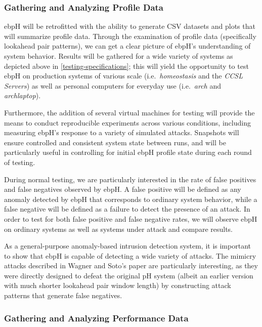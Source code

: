 \documentclass[
  12pt]{findlay}
\begin{document}
\hypertarget{gathering-and-analyzing-profile-data}{%
\subsubsection{Gathering and Analyzing Profile
Data}\label{gathering-and-analyzing-profile-data}}

ebpH will be retrofitted with the ability to generate CSV datasets and
plots that will summarize profile data. Through the examination of
profile data (specifically lookahead pair patterns), we can get a clear
picture of ebpH's understanding of system behavior. Results will be
gathered for a wide variety of systems as depicted above in
\autoref{testing-specifications}; this will yield the opportunity to
test ebpH on production systems of various scale
(i.e.~\emph{homeostasis} and the \emph{CCSL Servers}) as well as
personal computers for everyday use (i.e.~\emph{arch} and
\emph{archlaptop}).

Furthermore, the addition of several virtual machines for testing will
provide the means to conduct reproducible experiments across various
conditions, including measuring ebpH's response to a variety of
simulated attacks. Snapshots will ensure controlled and consistent
system state between runs, and will be particularly useful in
controlling for initial ebpH profile state during each round of testing.

During normal testing, we are particularly interested in the rate of
false positives and false negatives observed by ebpH. A false positive
will be defined as any anomaly detected by ebpH that corresponds to
ordinary system behavior, while a false negative will be defined as a
failure to detect the presence of an attack. In order to test for both
false positive and false negative rates, we will observe ebpH on
ordinary systems as well as systems under attack and compare results.

As a general-purpose anomaly-based intrusion detection system, it is
important to show that ebpH is capable of detecting a wide variety of
attacks. The mimicry attacks described in Wagner and Soto's paper
\autocite{wagner02} are particularly interesting, as they were directly
designed to defeat the original pH system (albeit an earlier version
with much shorter lookahead pair window length) by constructing attack
patterns that generate false negatives.

\hypertarget{gathering-and-analyzing-performance-data}{%
\subsubsection{Gathering and Analyzing Performance
Data}\label{gathering-and-analyzing-performance-data}}
\end{document}
